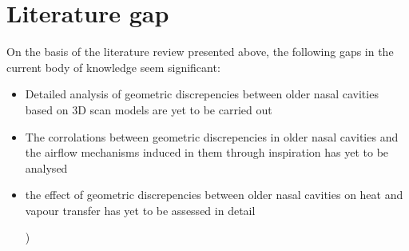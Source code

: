 \section{Literature gap}

On the basis of the literature review presented above, the following gaps in the current body of knowledge seem significant:

\begin{itemize}

  \item Detailed analysis of geometric discrepencies between older nasal cavities based on 3D scan models are yet to be carried out

  \item The corrolations between geometric discrepencies in older nasal cavities and the airflow mechanisms induced in them through inspiration has yet to be analysed

  \item the effect of geometric discrepencies between older nasal cavities on heat and vapour transfer has yet to be assessed in detail

)\end{itemize}
